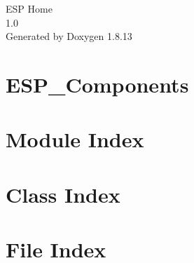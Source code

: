 \documentclass[twoside]{book}
\newcommand{\+}{\discretionary{\mbox{\scriptsize$\hookleftarrow$}}{}{}}
\newcommand{\clearemptydoublepage}{%
  \newpage{\pagestyle{empty}\cleardoublepage}%
}
\begin{document}
\hypersetup{pageanchor=false,
             bookmarksnumbered=true,
             pdfencoding=unicode
            }
\begin{titlepage}
\vspace*{7cm}
\begin{center}%
{\Large E\+SP Home \\[1ex]\large 1.\+0 }\\
\vspace*{1cm}
{\large Generated by Doxygen 1.8.13}\\
\end{center}
\end{titlepage}
\clearemptydoublepage
{}
\tableofcontents
\clearemptydoublepage
{}
\hypersetup{pageanchor=true}

\chapter{E\+S\+P\+\_\+\+Components}
\label{md_README}

\chapter{Module Index}

\chapter{Class Index}

\chapter{File Index}

\end{document}

